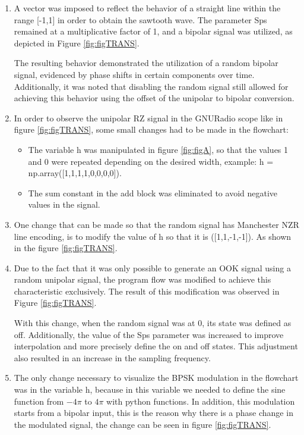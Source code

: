 \documentclass{journal}[IEEEtran, twocolumn]             %
\begin{document}
\begin{multicols}{2}
\begin{enumerate}
    \item A vector was imposed to reflect the behavior of a straight line within the range [-1,1] in order to obtain the sawtooth wave. The parameter Sps remained at a multiplicative factor of 1, and a bipolar signal was utilized, as depicted in Figure \ref{fig:figTRANS}.    

    The resulting behavior demonstrated the utilization of a random bipolar signal, evidenced by phase shifts in certain components over time. Additionally, it was noted that disabling the random signal still allowed for achieving this behavior using the offset of the unipolar to bipolar conversion.

    \item In order to observe the unipolar RZ signal in the GNURadio scope like in figure \ref{fig:figTRANS}, some small changes had to be made in the flowchart:
    \begin{itemize}
    \item The variable h was manipulated in figure \ref{fig:figA}, so that the values 1 and 0 were repeated depending on the desired width, example: h = np.array([1,1,1,1,0,0,0,0]).
    \item The sum constant in the add block was eliminated to avoid negative values in the signal.
    \end{itemize}

    \item One change that can be made so that the random signal has Manchester NZR line encoding, is to modify the value of h so that it is ([1,1,-1,-1]). As shown in the figure \ref{fig:figTRANS}.
    
    \item Due to the fact that it was only possible to generate an OOK signal using a random unipolar signal, the program flow was modified to achieve this characteristic exclusively. The result of this modification was observed in Figure \ref{fig:figTRANS}.

    With this change, when the random signal was at 0, its state was defined as off. Additionally, the value of the Sps parameter was increased to improve interpolation and more precisely define the on and off states. This adjustment also resulted in an increase in the sampling frequency.

    \item The only change necessary to visualize the BPSK modulation in the flowchart was in the variable h, because in this variable we needed to define the sine function from $-4\pi$ to $4\pi$ with python functions. In addition, this modulation starts from a bipolar input, this is the reason why there is a phase change in the modulated signal, the change can be seen in figure \ref{fig:figTRANS}.


\end{enumerate}
\end{multicols}
\end{document}
